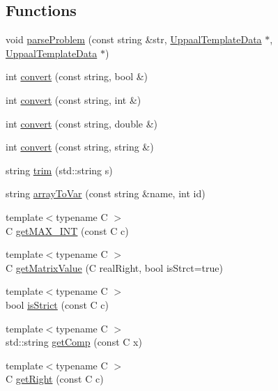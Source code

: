 \subsection*{Functions}
\begin{DoxyCompactItemize}
\item 
void \mbox{\hyperlink{namespacegraphsat_a7fe53bf89583dc8ec90c6669b17f8b6d}{parse\+Problem}} (const string \&str, \mbox{\hyperlink{classgraphsat_1_1_uppaal_template_data}{Uppaal\+Template\+Data}} $\ast$, \mbox{\hyperlink{classgraphsat_1_1_uppaal_template_data}{Uppaal\+Template\+Data}} $\ast$)
\item 
int \mbox{\hyperlink{namespacegraphsat_a986c3358c4863410e03f7b8c2e4f9387}{convert}} (const string, bool \&)
\item 
int \mbox{\hyperlink{namespacegraphsat_af4639b646d1b2e4485670e790ee6d182}{convert}} (const string, int \&)
\item 
int \mbox{\hyperlink{namespacegraphsat_a1e3a9de4e4dbde53a4ba0a16c401c70e}{convert}} (const string, double \&)
\item 
int \mbox{\hyperlink{namespacegraphsat_a5e9a43b1f7e9427b049a52876cd47e12}{convert}} (const string, string \&)
\item 
string \mbox{\hyperlink{namespacegraphsat_ae996ede22924c81a18a6697de7bcf9d5}{trim}} (std\+::string s)
\item 
string \mbox{\hyperlink{namespacegraphsat_a39f9605ea5701e91ea4d24f9b1e492ab}{array\+To\+Var}} (const string \&name, int id)
\item 
{\footnotesize template$<$typename C $>$ }\\C \mbox{\hyperlink{namespacegraphsat_a700d4c7efdb81dea623ce0d8f5c6aafc}{get\+M\+A\+X\+\_\+\+I\+NT}} (const C c)
\item 
{\footnotesize template$<$typename C $>$ }\\C \mbox{\hyperlink{namespacegraphsat_aaff479d8398d3b14b5a7126da128b136}{get\+Matrix\+Value}} (C real\+Right, bool is\+Strct=true)
\item 
{\footnotesize template$<$typename C $>$ }\\bool \mbox{\hyperlink{namespacegraphsat_a8c9f56766915c3d206d61da59ce005d1}{is\+Strict}} (const C c)
\item 
{\footnotesize template$<$typename C $>$ }\\std\+::string \mbox{\hyperlink{namespacegraphsat_a76b5c5d33071b5127713a4a75166f8b4}{get\+Comp}} (const C x)
\item 
{\footnotesize template$<$typename C $>$ }\\C \mbox{\hyperlink{namespacegraphsat_a7365b322cc23cabf0402ef03e6daafc7}{get\+Right}} (const C c)

\end{DoxyCompactItemize}
